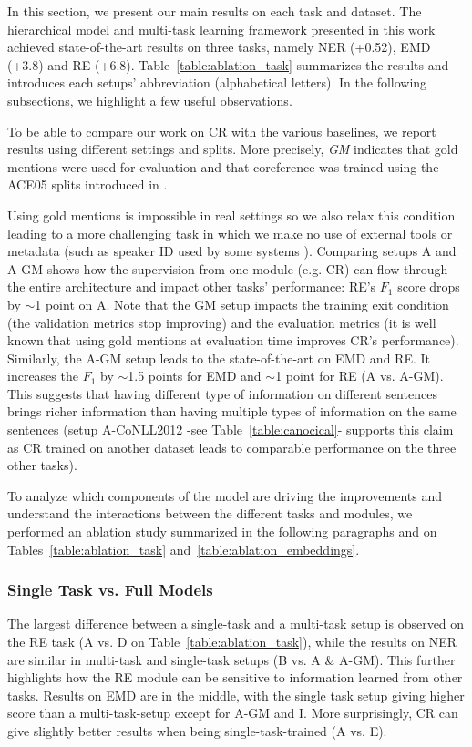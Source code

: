 \documentclass[letterpaper]{article}
\begin{document}
In this section, we present our main results on each task and dataset. The hierarchical model and multi-task learning framework presented in this work achieved state-of-the-art results on three tasks, namely NER (+0.52), EMD (+3.8) and RE (+6.8). Table~\ref{table:ablation_task} summarizes the results and introduces each setups' abbreviation (alphabetical letters). In the following subsections, we highlight a few useful observations.

To be able to compare our work on CR with the various baselines, we report results using different settings and splits. More precisely, \textit{GM} indicates that gold mentions were used for evaluation and that coreference was trained using the ACE05 splits introduced in \cite{Rahman2009}.

Using gold mentions is impossible in real settings so we also relax this condition leading to a more challenging task in which we make no use of external tools or metadata (such as speaker ID used by some systems \cite{Clark2015}). Comparing setups A and A-GM shows how the supervision from one module (e.g. CR) can flow through the entire architecture and impact other tasks' performance: RE's $F_{1}$ score drops by $\sim$1 point on A. Note that the GM setup impacts the training exit condition (the validation metrics stop improving) and the evaluation metrics (it is well known that using gold mentions at evaluation time improves CR's performance).
Similarly, the A-GM setup leads to the state-of-the-art on EMD and RE. It increases the $F_{1}$ by $\sim$1.5 points for EMD and $\sim$1 point for RE (A vs. A-GM). This suggests that having different type of information on different sentences brings richer information than having multiple types of information on the same sentences (setup A-CoNLL2012 -see Table~\ref{table:canocical}- supports this claim as CR trained on another dataset leads to comparable performance on the three other tasks).

To analyze which components of the model are driving the improvements and understand the interactions between the different tasks and modules, we performed an ablation study summarized in the following paragraphs and on Tables~\ref{table:ablation_task} and~\ref{table:ablation_embeddings}.

\subsubsection*{Single Task vs. Full Models}

The largest difference between a single-task and a multi-task setup is observed on the RE task (A vs. D on Table~\ref{table:ablation_task}), while the results on NER are similar in multi-task and single-task setups (B vs. A \& A-GM). This further highlights how the RE module can be sensitive to information learned from other tasks. Results on EMD are in the middle, with the single task setup giving higher score than a multi-task-setup except for A-GM and I. More surprisingly, CR can give slightly better results when being single-task-trained (A vs. E).
\end{document}
